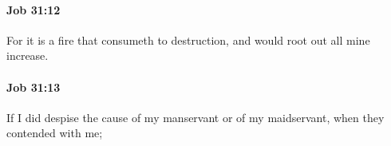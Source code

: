 		\paragraph{Job 31:12} %
			\label{JOB-31-12}

			For it is a fire that consumeth to destruction, and would root out all mine increase.


		\paragraph{Job 31:13} %
			\label{JOB-31-13}

			If I did despise the cause of my manservant or of my maidservant, when they contended with me;


